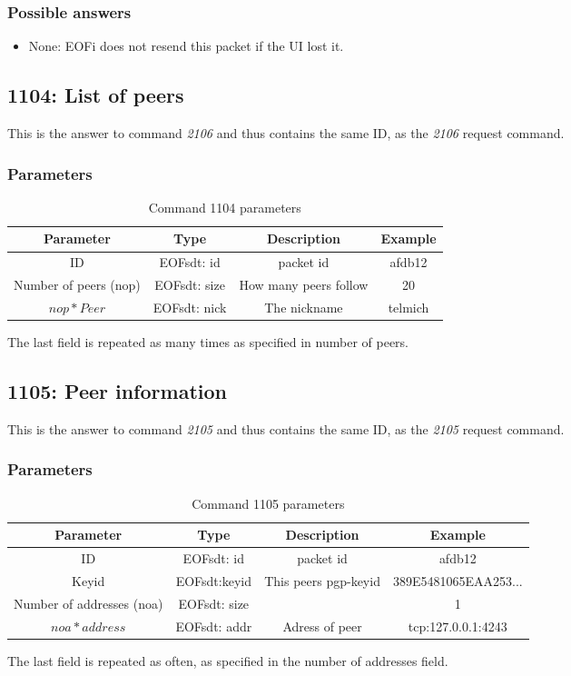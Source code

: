 \documentclass[12pt,a4paper]{book}
\begin{document}
\subsubsection{Possible answers}
\begin{itemize}
\item None: EOFi does not resend this packet if the UI lost it.
\end{itemize}
\subsection{1104: List of peers}
This is the answer to command \emph{2106} and thus contains the
same ID, as the \emph{2106} request command.
\subsubsection{Parameters}
\begin{longtable}{|c|c|c|c|}
\caption{Command 1104 parameters}\\
\hline
\textbf{Parameter} & \textbf{Type} & \textbf{Description} & \textbf{Example}\\
\hline
ID & EOFsdt: id & packet id & afdb12\\
\hline
Number of peers (nop) & EOFsdt: size & How many peers follow & 20\\
\hline
$nop * Peer$ & EOFsdt: nick & The nickname & telmich\\
\hline
\end{longtable}
The last field is repeated as many times as specified in number of peers.
\subsection{1105: Peer information}
This is the answer to command \emph{2105} and thus contains the
same ID, as the \emph{2105} request command.
\subsubsection{Parameters}
\begin{longtable}{|c|c|c|c|}
\caption{Command 1105 parameters}\\
\hline
\textbf{Parameter} & \textbf{Type} & \textbf{Description} & \textbf{Example}\\
\hline
ID & EOFsdt: id & packet id & afdb12\\
\hline
Keyid & EOFsdt:keyid & This peers pgp-keyid & 389E5481065EAA253...\\
\hline
Number of addresses (noa) & EOFsdt: size & & 1\\
\hline
$noa * address$ & EOFsdt: addr & Adress of peer & tcp:127.0.0.1:4243\\
\hline
\end{longtable}
The last field is repeated as often, as specified in the number of addresses
field.
\end{document}
